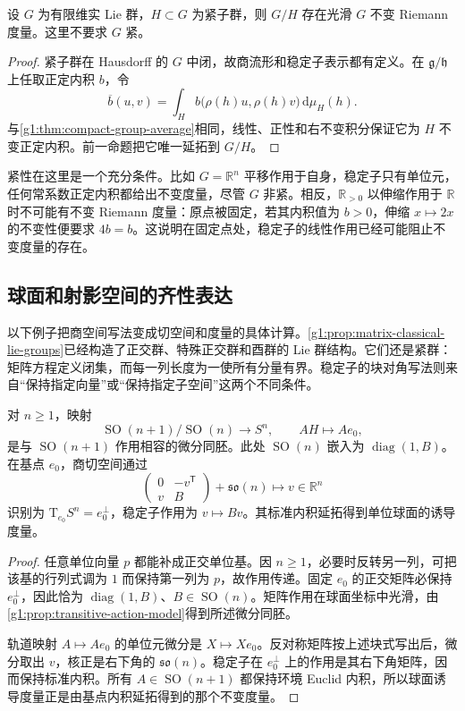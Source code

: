 \begin{corollary}\label{g1:cor:compact-isotropy-metric}
	设 \(G\) 为有限维实 Lie 群，\(H\subset G\) 为紧子群，则 \(G/H\) 存在光滑 \(G\) 不变 Riemann 度量。这里不要求 \(G\) 紧。
\end{corollary}
\begin{proof}
	紧子群在 Hausdorff 的 \(G\) 中闭，故商流形和稳定子表示都有定义。在 \(\mathfrak g/\mathfrak h\) 上任取正定内积 \(b\)，令
	\[
		\overline b(u,v)
		=\int_H b\bigl(\rho(h)u,\rho(h)v\bigr)\,\mathrm{d}\mu_H(h).
	\]
	与\cref{g1:thm:compact-group-average}相同，线性、正性和右不变积分保证它为 \(H\) 不变正定内积。前一命题把它唯一延拓到 \(G/H\)。
\end{proof}

紧性在这里是一个充分条件。比如 \(G=\mathbb R^n\) 平移作用于自身，稳定子只有单位元，任何常系数正定内积都给出不变度量，尽管 \(G\) 非紧。相反，\(\mathbb R_{>0}\) 以伸缩作用于 \(\mathbb R\) 时不可能有不变 Riemann 度量：原点被固定，若其内积值为 \(b>0\)，伸缩 \(x\mapsto2x\) 的不变性便要求 \(4b=b\)。这说明在固定点处，稳定子的线性作用已经可能阻止不变度量的存在。

\subsection{球面和射影空间的齐性表达}
\label{g1:subsec:1703:04}

以下例子把商空间写法变成切空间和度量的具体计算。\cref{g1:prop:matrix-classical-lie-groups}已经构造了正交群、特殊正交群和酉群的 Lie 群结构。它们还是紧群：矩阵方程定义闭集，而每一列长度为一使所有分量有界。稳定子的块对角写法则来自“保持指定向量”或“保持指定子空间”这两个不同条件。

\begin{proposition}\label{g1:prop:sphere-homogeneous-model}
	对 \(n\geq1\)，映射
	\[
		\operatorname{SO}(n+1)/\operatorname{SO}(n)\longrightarrow S^n,
		\qquad AH\longmapsto Ae_0,
	\]
	是与 \(\operatorname{SO}(n+1)\) 作用相容的微分同胚。此处 \(\operatorname{SO}(n)\) 嵌入为 \(\operatorname{diag}(1,B)\)。在基点 \(e_0\)，商切空间通过
	\[
		\begin{pmatrix}0&-v^{\mathsf T}\\v&B\end{pmatrix}
		+\mathfrak{so}(n)\longmapsto v\in\mathbb R^n
	\]
	识别为 \(\mathrm{T}_{e_0}S^n=e_0^\perp\)，稳定子作用为 \(v\mapsto Bv\)。其标准内积延拓得到单位球面的诱导度量。
\end{proposition}
\begin{proof}
	任意单位向量 \(p\) 都能补成正交单位基。因 \(n\geq1\)，必要时反转另一列，可把该基的行列式调为 \(1\) 而保持第一列为 \(p\)，故作用传递。固定 \(e_0\) 的正交矩阵必保持 \(e_0^\perp\)，因此恰为 \(\operatorname{diag}(1,B)\)、\(B\in\operatorname{SO}(n)\)。矩阵作用在球面坐标中光滑，由\cref{g1:prop:transitive-action-model}得到所述微分同胚。

	轨道映射 \(A\mapsto Ae_0\) 的单位元微分是 \(X\mapsto Xe_0\)。反对称矩阵按上述块式写出后，微分取出 \(v\)，核正是右下角的 \(\mathfrak{so}(n)\)。稳定子在 \(e_0^\perp\) 上的作用是其右下角矩阵，因而保持标准内积。所有 \(A\in\operatorname{SO}(n+1)\) 都保持环境 Euclid 内积，所以球面诱导度量正是由基点内积延拓得到的那个不变度量。
\end{proof}

